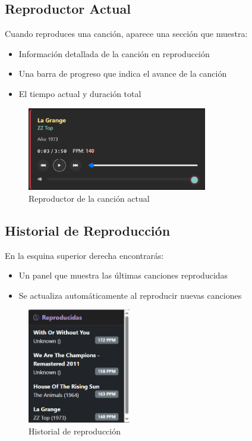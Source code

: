 \documentclass[a4paper,12pt]{article}
\begin{document}

\subsection{Reproductor Actual}
Cuando reproduces una canción, aparece una sección que muestra:
\begin{itemize}
    \item Información detallada de la canción en reproducción
    \item Una barra de progreso que indica el avance de la canción
    \item El tiempo actual y duración total
\end{itemize}

 \begin{figure}[h]
     \centering
     \includegraphics[width=0.7\textwidth]{imagenes/reproductor.png}
     \caption{Reproductor de la canción actual}
 \end{figure}

\subsection{Historial de Reproducción}
En la esquina superior derecha encontrarás:
\begin{itemize}
    \item Un panel que muestra las últimas canciones reproducidas
    \item Se actualiza automáticamente al reproducir nuevas canciones
\end{itemize}

 \begin{figure}[h]
     \centering
     \includegraphics[width=0.4\textwidth]{imagenes/historial.png}
     \caption{Historial de reproducción}
 \end{figure}
\end{document}
